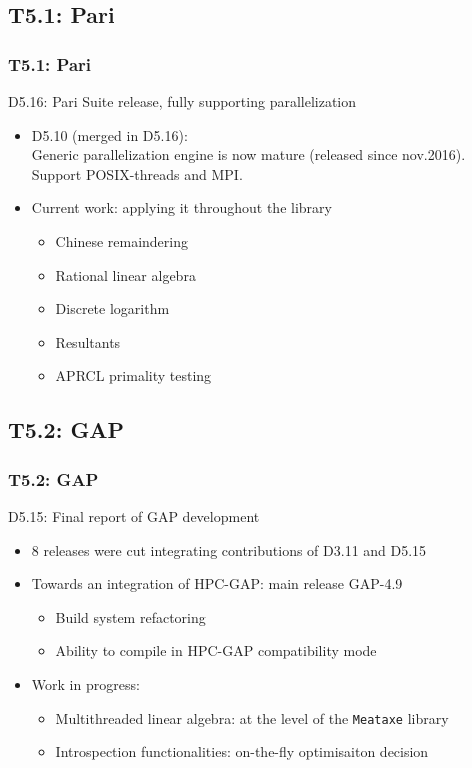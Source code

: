 \documentclass{beamer}
\begin{document}
\subsection{T5.1: Pari}
\begin{frame}
  \frametitle{T5.1: Pari}
  \begin{block} {D5.16: Pari Suite release, fully supporting parallelization}
    \begin{itemize}
    \item D5.10 (merged in D5.16):\\ Generic parallelization engine is now mature
      (released since nov.2016). Support POSIX-threads and MPI.
    \item Current work: applying it throughout the library
      \begin{itemize}
      \item Chinese remaindering
      \item Rational linear algebra
      \item Discrete logarithm
      \item Resultants
      \item APRCL primality testing
      \end{itemize}
      
      
    \end{itemize}
  \end{block}
\end{frame}

\subsection{T5.2: GAP}
\begin{frame}
  \frametitle{T5.2: GAP}
  \begin{block} {D5.15: Final report of GAP development}
    \begin{itemize}
    \item 8 releases were cut integrating contributions of D3.11 and D5.15
    \item Towards an integration of HPC-GAP: main release GAP-4.9
      \begin{itemize}
      \item Build system refactoring
      \item Ability to compile in HPC-GAP compatibility mode
      \end{itemize}
    \item Work in progress:
      \begin{itemize}
      \item  Multithreaded linear algebra: at the level of the \texttt{Meataxe} library
      \item Introspection functionalities: on-the-fly optimisaiton decision
      \end{itemize}
    \end{itemize}
  \end{block}
\end{frame}
\end{document}
